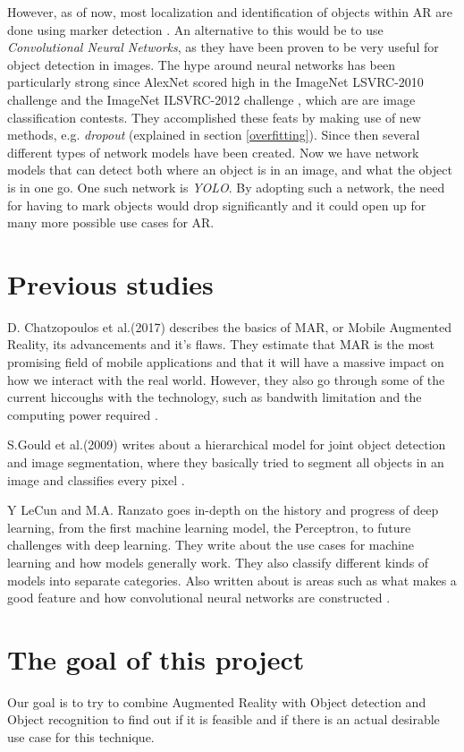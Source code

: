 However, as of now, most localization and identification of objects within AR are done using 
marker detection \cite{markerDetection}. An alternative to this would be to use 
\textit{Convolutional Neural Networks}, as they have been proven to be very useful for 
object detection in 
images. The hype around neural networks has been particularly strong since AlexNet scored 
high in the ImageNet LSVRC-2010 challenge and the ImageNet ILSVRC-2012 challenge 
\cite{NIPS2012_4824}, which are are image classification contests. They accomplished these feats by making use of new methods, e.g. 
\textit{dropout} (explained in section \ref{overfitting}). Since then several different types of network models have been created. 
Now we have network models that can detect both where an object is in an image, and what 
the object is in one go. One such network is \textit{YOLO}\cite{YOLO1}. By adopting such a 
network, the need for having to mark objects would drop significantly and it could open up 
for many more possible use cases for AR.
 
\section{Previous studies}
\label{subsecPrevStud}
D. Chatzopoulos et al.(2017) describes the basics of MAR, or Mobile Augmented Reality, its advancements and it's flaws. They estimate that MAR is the most promising field of mobile applications and that it will have a massive impact on how we interact with the real world. However, they also go through some of the current hiccoughs with the technology, such as bandwith limitation and the computing power required \cite{MARS}. 

S.Gould et al.(2009) writes about a hierarchical model for joint object detection and image segmentation, where they basically tried to segment all objects in an image and classifies every pixel \cite{NIPS2009_3766}. 


Y LeCun and M.A. Ranzato goes in-depth on the history and progress of deep learning, from the first machine learning model, the Perceptron, to future challenges with deep learning. They write about the use cases for machine learning and how models generally work. They also classify different kinds of models into separate categories. Also written about is areas such as what makes a good feature and how convolutional neural networks are constructed \cite{deepLearningTutorial}.


\section{The goal of this project}
\label{subsecGoal}
Our goal is to try to combine Augmented Reality with Object detection and Object recognition to find out if it is feasible and if there is an actual desirable use case for this technique. 

